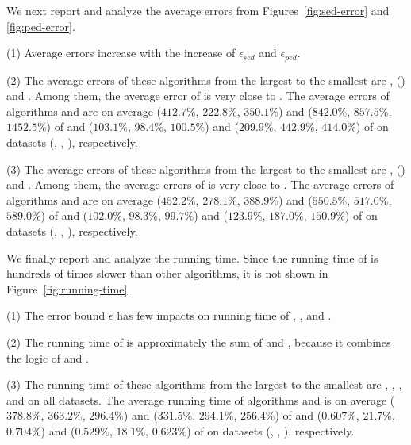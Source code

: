 {%




 We next report and analyze the average errors from Figures~\ref{fig:sed-error} and \ref{fig:ped-error}.

\ni (1) Average errors increase with the increase of $\epsilon_{sed}$ and $\epsilon_{ped}$.

\ni (2) The average \sed errors of these algorithms from the largest to the smallest are \sitt, \grts (\citt) and \ldrh. Among them, the average \sed error of \citt is very close to \grts.
The average \sed errors of algorithms \citt and \sitt are on average
($412.7\%$, $222.8\%$, $350.1\%$)
and ($842.0\%$, $857.5\%$, $1452.5\%$)
of \ldrh and ($103.1\%$, $98.4\%$, $100.5\%$) and
($209.9\%$, $442.9\%$, $414.0\%$)
of \grts on datasets (\mopsi, \sercar, \geolife), respectively.

\ni (3) The average \ped errors of these algorithms from the largest to the smallest are \sitt, \grts (\citt) and \ldrh. Among them, the average \ped errors of \citt is very close to \grts.
The average \ped errors of algorithms \citt and \sitt are on average
($452.2\%$, $278.1\%$, $388.9\%$)
and ($550.5\%$, $517.0\%$, $589.0\%$)
of \ldrh and ($102.0\%$, $98.3\%$, $99.7\%$) and
($123.9\%$, $187.0\%$, $150.9\%$)
of \grts on datasets (\mopsi, \sercar, \geolife), respectively.




 We finally report and analyze the running time.
Since the running time of \grts is hundreds of times slower than other algorithms, it is not shown in Figure~\ref{fig:running-time}.

\ni (1) The error bound $\epsilon$ has few impacts on running time of \citt, \sitt, \bitt and \ldrh.

\ni (2) The running time of \bitt is approximately the sum of \citt and \sitt, because it combines the logic of \citt and \sitt.

\ni (3) The running time of these algorithms from the largest to the smallest are \grts, \bitt, \citt, \sitt and \ldrh on all datasets.
The average running time of algorithms \citt and \sitt is on average
($378.8\%$, $363.2\%$, $296.4\%$)
and ($331.5\%$, $294.1\%$, $256.4\%$)
of \ldrh and ($0.607\%$, $21.7\%$, $0.704\%$) and
($0.529\%$, $18.1\%$, $0.623\%$)
of \grts on datasets (\mopsi, \sercar, \geolife), respectively.



}
